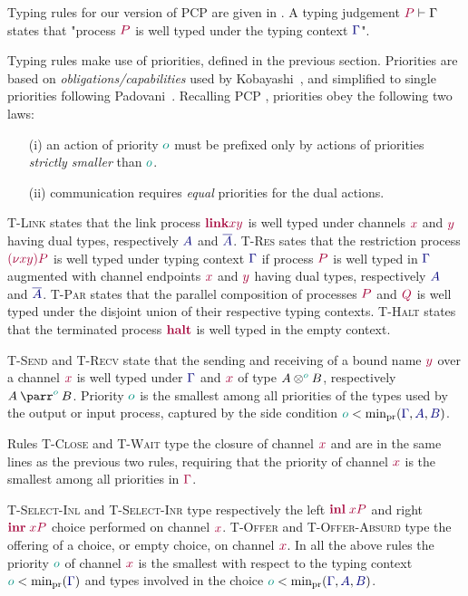 \documentclass[main.tex]{subfiles}
\begin{document}
Typing rules for our version of PCP are given in . A typing judgement $\seq{P}{\Gamma}$ states that "process $\tm{P}$ is well typed under the typing context $\ty \Gamma$".

Typing rules make use of priorities, defined in the previous section. Priorities are based on \emph{obligations/capabilities} used by Kobayashi~\cite{kobayashi06}, and simplified to single priorities following Padovani~\cite{padovani14}. Recalling PCP \cite{dardhagay18}, priorities obey the following two laws:
\begin{enumerate}
  \item [(i)] an action of priority $\cs o$ must be prefixed only by actions of priorities \emph{strictly smaller} than $\cs o$.
  \item [(ii)] communication requires \emph{equal} priorities for the dual actions.
\end{enumerate}
\textsc{T-Link} states that the link process $\tm{\link{x}{y}}$ is well typed under channels $\tm{x}$ and $\tm{y}$ having dual types, respectively $\ty A$ and $\ty {\co A}$. \textsc{T-Res} sates that the restriction process $\tm{\res{x}{y}{P}}$ is well typed under typing context $\ty\Gamma$ if process $\tm{P}$ is well typed in $\ty\Gamma$ augmented with channel endpoints $\tm{x}$ and $\tm{y}$ having dual types, respectively $\ty A$ and $\ty {\co A}$. \textsc{T-Par} states that the parallel composition of processes $\tm{P}$ and $\tm{Q}$ is well typed under the disjoint union of their respective typing contexts. \textsc{T-Halt} states that the terminated process $\tm{\halt}$ is well typed in the empty context.

\textsc{T-Send} and \textsc{T-Recv} state that the sending and receiving of a bound name $\tm{y}$ over a channel $\tm{x}$ is well typed under $\ty\Gamma$ and $\tm{x}$ of type $\tytens[\cs{o}]{A}{B}$, respectively ${\typarr[\cs{o}]{A}{B}}$. Priority $\cs o$ is the smallest among all priorities of the types used by the output or input process, captured by the side condition $\cs{o}<\minpr(\ty{\Gamma},\ty{A},\ty{B})$.

Rules \textsc{T-Close} and \textsc{T-Wait} type the closure of channel $\tm{x}$ and are in the same lines as the previous two rules, requiring that the priority of channel $\tm{x}$ is the smallest among all priorities in $\tm\Gamma$.

\textsc{T-Select-Inl} and \textsc{T-Select-Inr} type respectively the left $\tm{\inl{x}{P}}$ and right $\tm{\inr{x}{P}}$ choice performed on channel $\tm{x}$. \textsc{T-Offer} and \textsc{T-Offer-Absurd} type the offering of a choice, or empty choice, on channel $\tm{x}$. In all the above rules the priority $\cs o$ of channel $\tm{x}$ is the smallest with respect to the typing context $\cs{o}<\minpr(\ty{\Gamma})$ and types involved in the choice $\cs{o}<\minpr(\ty{\Gamma},\ty{A},\ty{B})$.
\end{document}
